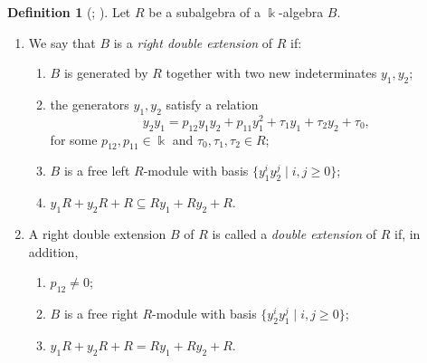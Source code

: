 \documentclass[reqno]{amsart}
\numberwithin{equation}{section}
\theoremstyle{definition}
\newtheorem{definition}[theorem]{Definition}
\begin{document}
\begin{definition}[{\cite[Definition~1.3]{ZZ08}; \cite[Definition~1.1]{CLM11}}]\label{def:double-ore}
Let \(R\) be a subalgebra of a \(\Bbbk\)-algebra \(B\).
\begin{enumerate}[label=\rm (\alph*)]
    \item We say that \(B\) is a \emph{right double extension} of \(R\) if:
    \begin{enumerate}[label=\rm (\roman*)]
        \item \(B\) is generated by \(R\) together with two new indeterminates \(y_1,y_2\);
        \item the generators \(y_1,y_2\) satisfy a relation
        \begin{equation}\label{eq:double-relation}
        y_2y_1=p_{12}y_1y_2+p_{11}y_1^2+\tau_1y_1+\tau_2y_2+\tau_0,
        \end{equation}
        for some \(p_{12},p_{11}\in\Bbbk\) and \(\tau_0,\tau_1,\tau_2\in R\);
        \item \(B\) is a free left \(R\)-module with basis \(\{y_1^iy_2^j\mid i,j\geq 0\}\);
        \item \(y_1R+y_2R+R\subseteq Ry_1+Ry_2+R\).
    \end{enumerate}
    \item A right double extension \(B\) of \(R\) is called a \emph{double extension} of \(R\) if, in addition,
    \begin{enumerate}[label=\rm (\roman*)]
        \item \(p_{12}\neq 0\);
        \item \(B\) is a free right \(R\)-module with basis \(\{y_2^iy_1^j\mid i,j\geq 0\}\);
        \item \(y_1R+y_2R+R=Ry_1+Ry_2+R\).
    \end{enumerate}
\end{enumerate}
\end{definition}
\end{document}
